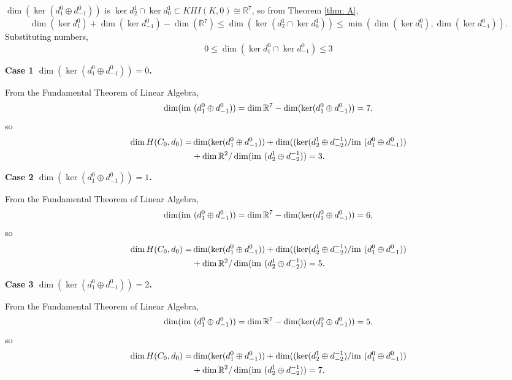 \documentclass{amsart}
\theoremstyle{definition}
\newcommand{\im}{{\rm im~}}
\begin{document}
$\dim(\ker (d^0_1\oplus d^0_{-1}))$ is $\ker d^{1}_{2} \cap \ker d^1_0 \subset KHI(K,0)\cong \mathbb{R}^7$, so from Theorem \ref{thm: A},
$$\dim (\ker d^0_{1})
+ 
\dim (\ker d^0_{-1} )
- 
\dim (\mathbb{R}^7)
\leq
\dim (\ker (d^{1}_{2} \cap \ker d^1_0))
\leq
\min (\dim (\ker d^0_{1}),\dim (\ker d^0_{-1})).
$$
Substituting numbers,
$$
0
\leq 
{\dim (\ker d^0_{1} \cap \ker d^0_{-1}) }
\leq 
3
$$

\textbf{Case 1 $\dim(\ker (d^0_1\oplus d^0_{-1}))= 0$.}

From the Fundamental Theorem of Linear Algebra,
$$\dim(\im (d^0_1\oplus d^0_{-1}))= \dim \mathbb{R}^7-\dim(\ker (d^0_1\oplus d^0_{-1}))=7,$$
so
\begin{equation*}
    \begin{aligned}
       \dim H(C_0,d_0)= 
        &
        \dim(\ker (d^0_1\oplus d^0_{-1}))
        +
        \dim((\ker (d^1_2\oplus d^{-1}_{-2})/\im(d^0_1\oplus d^0_{-1}))\\
        &
        +\dim \mathbb{R}^2/\dim (\im (d^1_2 \oplus d^{-1}_{-2}))
        =3.
    \end{aligned}
\end{equation*}


\textbf{Case 2 $\dim(\ker (d^0_1\oplus d^0_{-1}))= 1$.}

From the Fundamental Theorem of Linear Algebra,
$$\dim(\im (d^0_1\oplus d^0_{-1}))= \dim \mathbb{R}^7-\dim(\ker (d^0_1\oplus d^0_{-1}))=6,$$
so
\begin{equation*}
    \begin{aligned}
       \dim H(C_0,d_0)= 
        &\dim(\ker (d^0_1\oplus d^0_{-1}))
        +
        \dim((\ker (d^1_2\oplus d^{-1}_{-2})/\im(d^0_1\oplus d^0_{-1}))\\
        &+
        \dim \mathbb{R}^2/\dim (\im (d^1_2 \oplus d^{-1}_{-2}))
        =5.
    \end{aligned}
\end{equation*}

\textbf{Case 3 $\dim(\ker (d^0_1\oplus d^0_{-1}))= 2$.}

From the Fundamental Theorem of Linear Algebra,
$$\dim(\im (d^0_1\oplus d^0_{-1}))= \dim \mathbb{R}^7-\dim(\ker (d^0_1\oplus d^0_{-1}))=5,$$
so
\begin{equation*}
    \begin{aligned}
       \dim H(C_0,d_0)= 
        &\dim(\ker (d^0_1\oplus d^0_{-1}))
        +
        \dim((\ker (d^1_2\oplus d^{-1}_{-2})/\im(d^0_1\oplus d^0_{-1}))\\
        &+
        \dim \mathbb{R}^2/\dim (\im (d^1_2 \oplus d^{-1}_{-2}))
        =7.
    \end{aligned}
\end{equation*}
\end{document}
